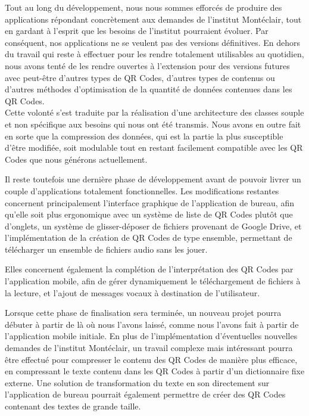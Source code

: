 \par
Tout au long du développement, nous nous sommes efforcés de produire des applications répondant concrètement aux demandes de l'institut Montéclair, tout en gardant à l'esprit que les besoins de l'institut pourraient évoluer. Par conséquent, nos applications ne se veulent pas des versions définitives. En dehors du travail qui reste à effectuer pour les rendre totalement utilisables au quotidien, nous avons tenté de les rendre ouvertes à l'extension pour des versions futures avec peut-être d'autres types de QR Codes, d'autres types de contenus ou d'autres méthodes d'optimisation de la quantité de données contenues dans les QR Codes.\\
Cette volonté s'est traduite par la réalisation d'une architecture des classes souple et non spécifique aux besoins qui nous ont été transmis. Nous avons en outre fait en sorte que la compression des données, qui est la partie la plus susceptible d'être modifiée, soit modulable tout en restant facilement compatible avec les QR Codes que nous générons actuellement.\\

\par
Il reste toutefois une dernière phase de développement avant de pouvoir livrer un couple d'applications totalement fonctionnelles. Les modifications restantes concernent principalement l'interface graphique de l'application de bureau, afin qu'elle soit plus ergonomique avec un système de liste de QR Codes plutôt que d'onglets, un système de glisser-déposer de fichiers provenant de Google Drive, et l'implémentation de la création de QR Codes de type ensemble, permettant de télécharger un ensemble de fichiers audio sans les jouer.
\par
Elles concernent également la complétion de l'interprétation des QR Codes par l'application mobile, afin de gérer dynamiquement le téléchargement de fichiers à la lecture, et l'ajout de messages vocaux à destination de l'utilisateur.\\

\par
Lorsque cette phase de finalisation sera terminée, un nouveau projet pourra débuter à partir de là où nous l'avons laissé, comme nous l'avons fait à partir de l'application mobile initiale. En plus de l'implémentation d'éventuelles nouvelles demandes de l'institut Montéclair, un travail complexe mais intéressant pourra être effectué pour compresser le contenu des QR Codes de manière plus efficace, en compressant le texte contenu dans les QR Codes à partir d'un dictionnaire fixe externe. Une solution de transformation du texte en son directement sur l'application de bureau pourrait également permettre de créer des QR Codes contenant des textes de grande taille.